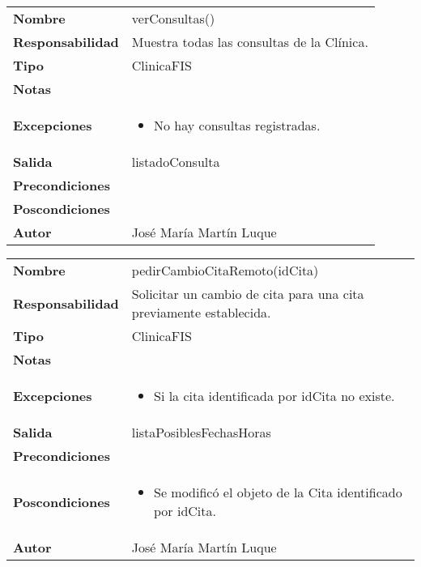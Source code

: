 \documentclass[11pt,a4paper]{article}
\newenvironment{itemizenomargins}
    {\begin{minipage}[t]{1\linewidth}\begin{itemize}}
    {\end{itemize}\end{minipage}}
\begin{document}
\begin{table}[H]
	\centering
	\label{my-label}
	\begin{tabularx}{\textwidth}{l|X}
    \textbf{Nombre}          & verConsultas()\\
		\textbf{Responsabilidad} & Muestra todas las consultas de la Clínica. \\
		\textbf{Tipo}            & ClinicaFIS \\
		\textbf{Notas}           &  \\
		\textbf{Excepciones}     &
		\begin{itemizenomargins}
			\item No hay consultas registradas.
		\end{itemizenomargins} \\
		\textbf{Salida}          &  listadoConsulta\\
		\textbf{Precondiciones}  & \\
		\textbf{Poscondiciones}  & \\  
		\textbf{Autor}			 & José María Martín Luque
	\end{tabularx}
\end{table}

\begin{table}[H]
	\centering
	\label{pedir-cambio-cita-remoto}
	\begin{tabularx}{\textwidth}{l|X}
    \textbf{Nombre}          & pedirCambioCitaRemoto(idCita)\\
		\textbf{Responsabilidad} & Solicitar un cambio de cita para una cita previamente establecida. \\
		\textbf{Tipo}            & ClinicaFIS \\
		\textbf{Notas}           &  \\
		\textbf{Excepciones}     & 
		\begin{itemizenomargins}
			\item Si la cita identificada por idCita no existe.
		\end{itemizenomargins} \\
		\textbf{Salida}          &  listaPosiblesFechasHoras\\
		\textbf{Precondiciones}  &  \\
		\textbf{Poscondiciones}  & 
		\begin{itemizenomargins}
			\item Se modificó el objeto de la Cita identificado por idCita.
		\end{itemizenomargins} \\
		\textbf{Autor}			 & José María Martín Luque
	\end{tabularx}
\end{table}
\end{document}
